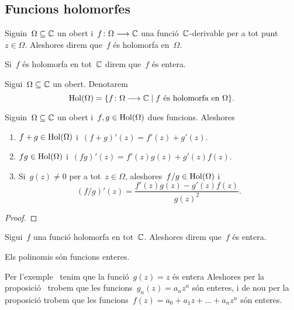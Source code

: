 \documentclass[../Apunts.tex]{subfiles}
\begin{document}
	\subsection{Funcions holomorfes}
	\begin{definition}
		\label{def:funció holomorfa}
		Siguin~\(\Omega\subseteq\mathbb{C}\) un obert
		i~\(f\colon\Omega\longrightarrow\mathbb{C}\) una funció~\(\mathbb{C}\)-derivable per
		a tot punt~\(z\in\Omega\).
		Aleshores direm que~\(f\) és holomorfa en~\(\Omega\).
		
		Si~\(f\) és holomorfa en tot~\(\mathbb{C}\) direm que~\(f\) és entera.
	\end{definition}
	\begin{notation}
		Sigui~\(\Omega\subseteq\mathbb{C}\) un obert.
		Denotarem
		\[
			\operatorname{Hol}(\Omega)
			=\{f\colon\Omega\longrightarrow\mathbb{C}\mid f\text{ és holomorfa en }\Omega\}.
		\]
	\end{notation}
	\begin{proposition}
		\label{prop:derivació de funcions holomorfes}
		Siguin~\(\Omega\subseteq\mathbb{C}\) un obert i~\(f,g\in\operatorname{Hol}(\Omega)\) dues
		funcions.
		Aleshores
		\begin{enumerate}
			\item \(f+g\in\operatorname{Hol}(\Omega)\) i~\((f+g)'(z)=f'(z)+g'(z)\).
			\item \(fg\in\operatorname{Hol}(\Omega)\) i~\((fg)'(z)=f'(z)g(z)+g'(z)f(z)\).
			\item Si~\(g(z)\neq0\) per a tot~\(z\in\Omega\),
				aleshores~\(f/g\in\operatorname{Hol}(\Omega)\) i
				\[(f/g)'(z)=\frac{f'(z)g(z)-g'(z)f(z)}{g(z)^{2}}.\]
		\end{enumerate}
	\end{proposition}
	\begin{proof}
	\end{proof}
	\begin{definition}
		\label{def:funció entera}
		Sigui~\(f\) una funció holomorfa en tot~\(\mathbb{C}\).
		Aleshores direm que~\(f\) és entera.
	\end{definition}
	\begin{example}
		Els polinomis són funcions enteres.
	\end{example}
	\begin{solution}
		Per l'exemple~ tenim que la
		funció~\(g(z)=z\) és entera
		Aleshores per la proposició~
		trobem que les funcions~\(g_{n}(z)=a_{n}z^{n}\) són enteres, i de nou
		per la proposició trobem que les
		funcions~\(f(z)=a_{0}+a_{1}z+\dots+a_{n}z^{n}\) són enteres.
	\end{solution}
\end{document}
